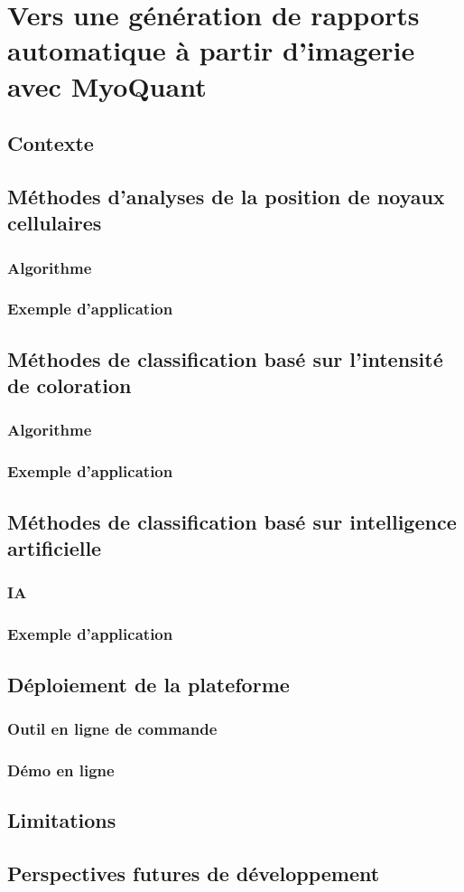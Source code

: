 \chapter{Vers une génération de rapports automatique à partir d’imagerie avec MyoQuant}

\section{Contexte}
\section{Méthodes d'analyses de la position de noyaux cellulaires}
\subsection{Algorithme}
\subsection{Exemple d'application}
\section{Méthodes de classification basé sur l'intensité de coloration}
\subsection{Algorithme}
\subsection{Exemple d'application}
\section{Méthodes de classification basé sur intelligence artificielle}
\subsection{IA}
\subsection{Exemple d'application}
\section{Déploiement de la plateforme}
\subsection{Outil en ligne de commande}
\subsection{Démo en ligne}
\section{Limitations}
\section{Perspectives futures de développement}